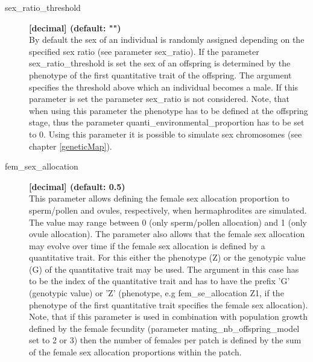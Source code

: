 \documentclass[letterpaper,12pt,oneside]{book}
\begin{document}
\begin{description}
\item[sex\_ratio\_threshold] \textbf{[decimal] (default: "")}\\
By default the sex of an individual is randomly assigned depending on the specified sex ratio (see parameter \textsf{sex\_ratio}). If the parameter \textsf{sex\_ratio\_threshold} is set the sex of an offspring is determined by the phenotype of the first quantitative trait of the offspring. The argument specifies the threshold above which an individual becomes a male. If this parameter is set the parameter \textsf{sex\_ratio} is not considered. Note, that when using this parameter the phenotype has to be defined at the offspring stage, thus the parameter \textsf{quanti\_environmental\_proportion} has to be set to 0. Using this parameter it is possible to simulate sex chromosomes (see chapter \ref{geneticMap}).  

\item[fem\_sex\_allocation] \textbf{[decimal] (default: 0.5)}\\
This parameter allows defining the female sex allocation proportion to sperm/pollen and ovules, respectively, when hermaphrodites are simulated. The value may range between 0 (only sperm/pollen allocation) and 1 (only ovule allocation). The parameter also allows that the female sex allocation may evolve over time if the female sex allocation is defined by a quantitative trait. For this either the phenotype (Z) or the genotypic value (G) of the quantitative trait may be used. The argument in this case has to be the index of the quantitative trait and has to have the prefix 'G' (genotypic value) or 'Z' (phenotype, e.g \textsf{fem\_se\_allocation} Z1, if the phenotype of the first quantitative trait specifies the female sex allocation). Note, that if this parameter is used in combination with population growth defined by the female fecundity (parameter \textsf{mating\_nb\_offspring\_model} set to 2 or 3) then the number of females per patch is defined by the sum of the female sex allocation proportions within the patch.


\end{description}
\end{document}
